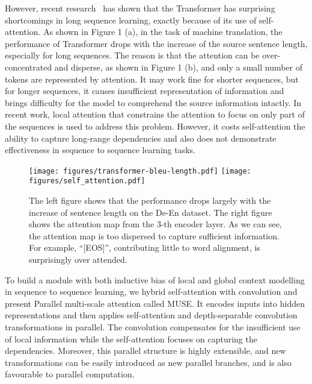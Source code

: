 \documentclass{article} \usepackage{iclr2020_conference,times}
\begin{document}
However, recent research~\citep{DBLP:conf/emnlp/TangMRS18} has shown that the Transformer has surprising shortcomings in long sequence learning, exactly because of its use of self-attention. As shown in Figure 1 (a), in the task of machine translation, the performance of Transformer drops with the increase of the source sentence length, especially for long sequences. The reason is that the attention can be over-concentrated and disperse, as shown in Figure 1 (b), and only a small number of tokens are represented by attention. It may work fine for shorter sequences, but for longer sequences, it  causes insufficient representation of information and brings difficulty for the model to comprehend the source information intactly. In recent work, local attention that constrains the attention to focus on only part of the sequences \citep{child2019generating,Sukhbaatar_2019} is used to address this problem. However, it costs self-attention the ability to capture long-range dependencies and also does not demonstrate effectiveness in sequence to sequence learning tasks.




\begin{figure}[ht]
\centering
\texttt{[image: figures/transformer-bleu-length.pdf]} \qquad
\texttt{[image: figures/self\_attention.pdf]}
\caption{The left figure shows that the performance drops largely with the increase of sentence length on the De-En dataset. The right figure shows the attention map from the $3$-th encoder layer. As we can see, the attention map is too dispersed to capture sufficient information. For example, ``[EOS]'', contributing little to word alignment, is surprisingly over attended.}
\label{fig:motivation}
\end{figure}

To build a module with both inductive bias of local and global context modelling in sequence to sequence learning, we hybrid self-attention with convolution and present Parallel multi-scale attention called MUSE.  It  encodes inputs into hidden representations and then  applies self-attention  and  depth-separable convolution transformations in parallel. The convolution compensates for the insufficient use of local information while the self-attention focuses on capturing the dependencies. Moreover, this parallel structure is highly extensible, and new transformations can be easily introduced as new parallel branches, and is also favourable to parallel computation.
\end{document}
